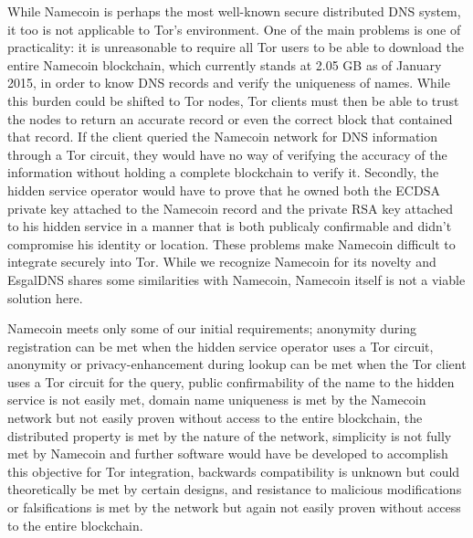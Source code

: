 While Namecoin is perhaps the most well-known secure distributed DNS system, it too is not applicable to Tor's environment. One of the main problems is one of practicality: it is unreasonable to require all Tor users to be able to download the entire Namecoin blockchain, which currently stands at 2.05 GB as of January 2015,\cite{BitInfoCharts} in order to know DNS records and verify the uniqueness of names. While this burden could be shifted to Tor nodes, Tor clients must then be able to trust the nodes to return an accurate record or even the correct block that contained that record. If the client queried the Namecoin network for DNS information through a Tor circuit, they would have no way of verifying the accuracy of the information without holding a complete blockchain to verify it. Secondly, the hidden service operator would have to prove that he owned both the ECDSA private key attached to the Namecoin record and the private RSA key attached to his hidden service in a manner that is both publicaly confirmable and didn't compromise his identity or location. These problems make Namecoin difficult to integrate securely into Tor. While we recognize Namecoin for its novelty and EsgalDNS shares some similarities with Namecoin, Namecoin itself is not a viable solution here.

Namecoin meets only some of our initial requirements; anonymity during registration can be met when the hidden service operator uses a Tor circuit, anonymity or privacy-enhancement during lookup can be met when the Tor client uses a Tor circuit for the query, public confirmability of the name to the hidden service is not easily met, domain name uniqueness is met by the Namecoin network but not easily proven without access to the entire blockchain, the distributed property is met by the nature of the network, simplicity is not fully met by Namecoin and further software would have be developed to accomplish this objective for Tor integration, backwards compatibility is unknown but could theoretically be met by certain designs, and resistance to malicious modifications or falsifications is met by the network but again not easily proven without access to the entire blockchain.
